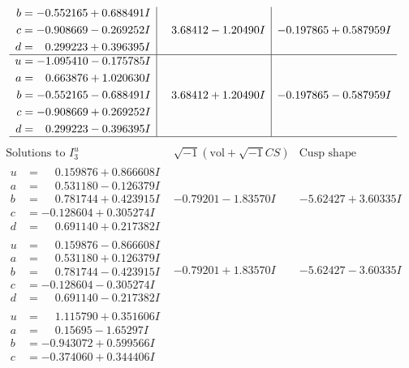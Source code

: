 \documentclass[1p]{elsarticle_modified}
\theoremstyle{definition}
\newcommand{\I}{\sqrt{-1}}
\begin{document}
$$\begin{array}{c|c|c}
\begin{aligned}
b &= -0.552165 + 0.688491 I \\
c &= -0.908669 - 0.269252 I \\
d &= \phantom{-}0.299223 + 0.396395 I\end{aligned}
 & \phantom{-}3.68412 - 1.20490 I & -0.197865 + 0.587959 I \\ \hline\begin{aligned}
u &= -1.095410 - 0.175785 I \\
a &= \phantom{-}0.663876 + 1.020630 I \\
b &= -0.552165 - 0.688491 I \\
c &= -0.908669 + 0.269252 I \\
d &= \phantom{-}0.299223 - 0.396395 I\end{aligned}
 & \phantom{-}3.68412 + 1.20490 I & -0.197865 - 0.587959 I\\
 \hline 
 \end{array}$$\newpage$$\begin{array}{c|c|c}  
\text{Solutions to }I^u_{3}& \I (\text{vol} + \sqrt{-1}CS) & \text{Cusp shape}\\
 \hline 
\begin{aligned}
u &= \phantom{-}0.159876 + 0.866608 I \\
a &= \phantom{-}0.531180 - 0.126379 I \\
b &= \phantom{-}0.781744 + 0.423915 I \\
c &= -0.128604 + 0.305274 I \\
d &= \phantom{-}0.691140 + 0.217382 I\end{aligned}
 & -0.79201 - 1.83570 I & -5.62427 + 3.60335 I \\ \hline\begin{aligned}
u &= \phantom{-}0.159876 - 0.866608 I \\
a &= \phantom{-}0.531180 + 0.126379 I \\
b &= \phantom{-}0.781744 - 0.423915 I \\
c &= -0.128604 - 0.305274 I \\
d &= \phantom{-}0.691140 - 0.217382 I\end{aligned}
 & -0.79201 + 1.83570 I & -5.62427 - 3.60335 I \\ \hline\begin{aligned}
u &= \phantom{-}1.115790 + 0.351606 I \\
a &= \phantom{-}0.15695 - 1.65297 I \\
b &= -0.943072 + 0.599566 I \\
c &= -0.374060 + 0.344406 I \\

\end{aligned}
\end{array}$$
\end{document}

